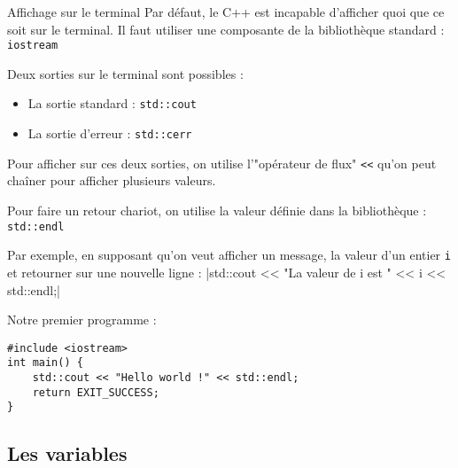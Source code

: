 \documentclass[compress,10pt,aspectratio=169]{beamer}
\begin{document}
\begin{frame}[fragile]{Affichage sur le terminal}
\scriptsize
Par défaut, le C++ est incapable d'afficher quoi que ce soit sur le terminal. Il faut utiliser une composante de la bibliothèque standard : \texttt{iostream}

Deux sorties sur le terminal sont possibles :
\begin{itemize}
\item La sortie standard : \texttt{std::cout}
\item La sortie d'erreur   : \texttt{std::cerr}
\end{itemize}

Pour afficher sur ces deux sorties, on utilise l'"opérateur de flux" \texttt{<<} qu'on peut chaîner pour afficher plusieurs valeurs.
    
Pour faire un retour chariot, on utilise la valeur définie dans la bibliothèque : \texttt{std::endl}

Par exemple, en supposant qu'on veut afficher un message, la valeur d'un entier \texttt{i} et retourner sur une nouvelle ligne :
|std::cout << "La valeur de i est " << i << std::endl;|

\begin{exampleblock}{\small Notre premier programme :}
\begin{verbatim}
#include <iostream>
int main() {
    std::cout << "Hello world !" << std::endl;
    return EXIT_SUCCESS;
}
\end{verbatim}
\end{exampleblock}

\end{frame}

\subsection{Les variables}
\end{document}
